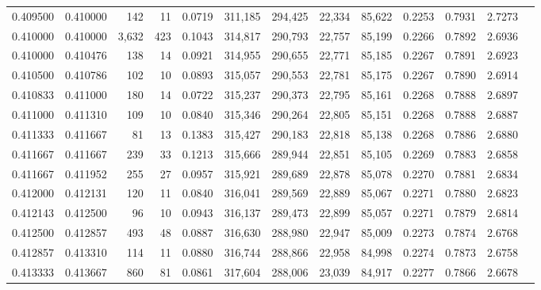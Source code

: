 \begin{tabular}{rrrrrrrrrrrrr}
0.409500 & 0.410000 &   142 &  11 &                                     0.0719 & 311,185 & 294,425 &  22,334 &  85,622 & 0.2253 & 0.7931 & 2.7273 \\
0.410000 & 0.410000 & 3,632 & 423 &                                     0.1043 & 314,817 & 290,793 &  22,757 &  85,199 & 0.2266 & 0.7892 & 2.6936 \\
0.410000 & 0.410476 &   138 &  14 &                                     0.0921 & 314,955 & 290,655 &  22,771 &  85,185 & 0.2267 & 0.7891 & 2.6923 \\
0.410500 & 0.410786 &   102 &  10 &                                     0.0893 & 315,057 & 290,553 &  22,781 &  85,175 & 0.2267 & 0.7890 & 2.6914 \\
0.410833 & 0.411000 &   180 &  14 &                                     0.0722 & 315,237 & 290,373 &  22,795 &  85,161 & 0.2268 & 0.7888 & 2.6897 \\
0.411000 & 0.411310 &   109 &  10 &                                     0.0840 & 315,346 & 290,264 &  22,805 &  85,151 & 0.2268 & 0.7888 & 2.6887 \\
0.411333 & 0.411667 &    81 &  13 &                                     0.1383 & 315,427 & 290,183 &  22,818 &  85,138 & 0.2268 & 0.7886 & 2.6880 \\
0.411667 & 0.411667 &   239 &  33 &                                     0.1213 & 315,666 & 289,944 &  22,851 &  85,105 & 0.2269 & 0.7883 & 2.6858 \\
0.411667 & 0.411952 &   255 &  27 &                                     0.0957 & 315,921 & 289,689 &  22,878 &  85,078 & 0.2270 & 0.7881 & 2.6834 \\
0.412000 & 0.412131 &   120 &  11 &                                     0.0840 & 316,041 & 289,569 &  22,889 &  85,067 & 0.2271 & 0.7880 & 2.6823 \\
0.412143 & 0.412500 &    96 &  10 &                                     0.0943 & 316,137 & 289,473 &  22,899 &  85,057 & 0.2271 & 0.7879 & 2.6814 \\
0.412500 & 0.412857 &   493 &  48 &                                     0.0887 & 316,630 & 288,980 &  22,947 &  85,009 & 0.2273 & 0.7874 & 2.6768 \\
0.412857 & 0.413310 &   114 &  11 &                                     0.0880 & 316,744 & 288,866 &  22,958 &  84,998 & 0.2274 & 0.7873 & 2.6758 \\
0.413333 & 0.413667 &   860 &  81 &                                     0.0861 & 317,604 & 288,006 &  23,039 &  84,917 & 0.2277 & 0.7866 & 2.6678 \\

\end{tabular}
